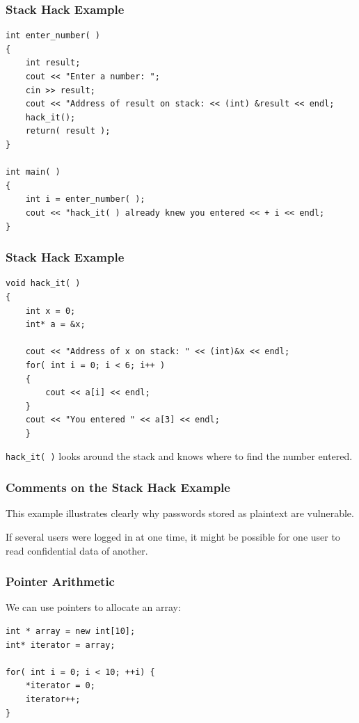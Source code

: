 \begin{frame}[fragile]
\frametitle{Stack Hack Example}
{\scriptsize
\begin{verbatim}
int enter_number( )
{
    int result;
    cout << "Enter a number: ";
    cin >> result;
    cout << "Address of result on stack: << (int) &result << endl;
    hack_it();
    return( result );
}

int main( )
{
    int i = enter_number( );
    cout << "hack_it( ) already knew you entered << + i << endl;
}
\end{verbatim}
}

\end{frame}

\begin{frame}[fragile]
\frametitle{Stack Hack Example}
{\scriptsize
\begin{verbatim}
void hack_it( )
{
    int x = 0;
    int* a = &x;

    cout << "Address of x on stack: " << (int)&x << endl;
    for( int i = 0; i < 6; i++ )
    {
        cout << a[i] << endl;	
    }
    cout << "You entered " << a[3] << endl;
    }
\end{verbatim}
}

\texttt{hack\_it( )} looks around the stack and knows where to find the number entered.

\end{frame}

\begin{frame}
\frametitle{Comments on the Stack Hack Example}

This example illustrates clearly why passwords stored as plaintext are vulnerable.

If several users were logged in at one time, it might be possible for one user to read confidential data of another.

\end{frame}




\begin{frame}[fragile]
\frametitle{Pointer Arithmetic}

We can use pointers to allocate an array:

\begin{verbatim}
int * array = new int[10];
int* iterator = array;

for( int i = 0; i < 10; ++i) {
    *iterator = 0;
    iterator++;
}


\end{verbatim}


\end{frame}

